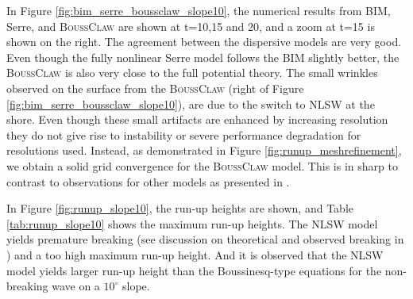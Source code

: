 \documentclass[review]{elsarticle}
\newcommand{\BoussClaw}{\textsc{BoussClaw} }
\begin{document}
In Figure \ref{fig:bim_serre_boussclaw_slope10}, the numerical results
from BIM, Serre, and \BoussClaw are shown at t=10,15 and 20, 
and a zoom at t=15 is shown on the right. 
The agreement between the dispersive models are very good. Even though the fully nonlinear Serre model follows the BIM slightly better, 
the \BoussClaw is also very close to the full potential theory. 
The small wrinkles observed on the surface 
from the \BoussClaw (right of Figure \ref{fig:bim_serre_boussclaw_slope10}), 
are due to the switch to NLSW at the shore. 
Even though these small artifacts are enhanced by increasing resolution they do not give rise to instability or severe 
performance degradation for resolutions used. 
Instead, as demonstrated in Figure \ref{fig:runup_meshrefinement}, 
we obtain a solid grid convergence for the \BoussClaw model. 
This is in sharp to contrast to observations for other models as presented in  \cite{Lovholt:2013a}.

In Figure \ref{fig:runup_slope10}, the run-up heights
are shown, and Table \ref{tab:runup_slope10} shows
the maximum run-up heights.
The NLSW model yields premature breaking (see discussion on theoretical and observed breaking in \cite{Pedersen:2013}) and a too high maximum run-up height. 
And it is observed that the NLSW model 
yields larger run-up height than the Boussinesq-type equations
for the non-breaking wave on a $10^\circ$ slope. 
\end{document}
